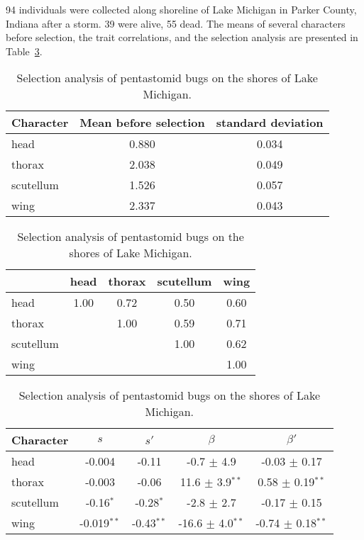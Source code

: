 \documentclass[12pt]{article}
\begin{document}
94 individuals were collected along shoreline of Lake Michigan in
Parker County, Indiana after a storm. 39 were alive, 55 dead. The
means of several characters before selection, the trait correlations,
and the selection analysis are presented in
Table~\ref{table:data}.

\begin{table}
\begin{center}
\begin{tabular}{l|cc}
\hline\hline
Character & Mean before selection & standard deviation \\
\hline
head      & 0.880                 & 0.034 \\
thorax    & 2.038                 & 0.049 \\
scutellum & 1.526                 & 0.057 \\
wing      & 2.337                 & 0.043 \\
\hline
\end{tabular}
\vskip 4pt
\begin{tabular}{l|cccc}
\hline\hline
          & head & thorax & scutellum & wing \\
\hline
head      & 1.00 & 0.72   & 0.50      & 0.60 \\
thorax    &      & 1.00   & 0.59      & 0.71 \\
scutellum &      &        & 1.00      & 0.62 \\
wing      &      &        &           & 1.00 \\
\hline
\end{tabular}
\vskip 4pt
\begin{tabular}{l|cccc}
\hline\hline
Character & $s$    & $s'$  & $\beta$ & $\beta'$ \\
\hline
head      & -0.004 & -0.11 & -0.7 $\pm$ 4.9 & -0.03 $\pm$ 0.17 \\
thorax    & -0.003 & -0.06 & 11.6 $\pm$ 3.9$^{**}$ & 0.58 $\pm$ 0.19$^{**}$
\\
scutellum & -0.16$^*$ & -0.28$^*$ & -2.8 $\pm$ 2.7 & -0.17 $\pm$ 0.15 \\
wing      & -0.019$^{**}$ & -0.43$^{**}$ & -16.6 $\pm$ 4.0$^{**}$ & -0.74 $\pm$
0.18$^{**}$ \\
\hline
\end{tabular}
\end{center}
\caption{Selection analysis of pentastomid bugs on the shores of Lake
Michigan.}\label{table:data}
\end{table}
\end{document}
